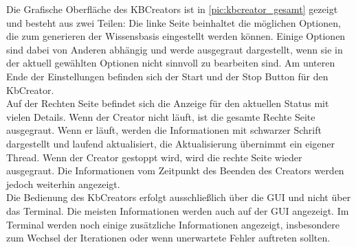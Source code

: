 \documentclass[12pt,a4paper]{article}
\begin{document}
Die Grafische Oberfläche des KBCreators ist in \autoref{pic:kbcreator_gesamt} gezeigt und besteht aus zwei Teilen: Die linke Seite beinhaltet die möglichen Optionen, die zum generieren der Wissensbasis eingestellt werden können. Einige Optionen sind dabei von Anderen abhängig und werde ausgegraut dargestellt, wenn sie in der aktuell gewählten Optionen nicht sinnvoll zu bearbeiten sind. Am unteren Ende der Einstellungen befinden sich der Start und der Stop Button für den KbCreator.\\
Auf der Rechten Seite befindet sich die Anzeige für den aktuellen Status mit vielen Details. Wenn der Creator nicht läuft, ist die gesamte Rechte Seite ausgegraut. Wenn er läuft, werden die Informationen mit schwarzer Schrift dargestellt und laufend aktualisiert, die Aktualisierung übernimmt ein eigener Thread. Wenn der Creator gestoppt wird, wird die rechte Seite wieder ausgegraut. Die Informationen vom Zeitpunkt des Beenden des Creators werden jedoch weiterhin angezeigt. \\
Die Bedienung des KbCreators erfolgt ausschließlich über die GUI und nicht über das Terminal. Die meisten Informationen werden auch auf der GUI angezeigt. Im Terminal werden noch einige zusätzliche Informationen angezeigt, insbesondere zum Wechsel der Iterationen oder wenn unerwartete Fehler auftreten sollten.
\end{document}
